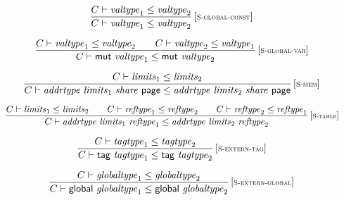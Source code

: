 $$
\begin{array}{@{}c@{}}\displaystyle
\frac{
C \vdash {\mathit{valtype}}_1 \leq {\mathit{valtype}}_2
}{
C \vdash {\mathit{valtype}}_1 \leq {\mathit{valtype}}_2
} \, {[\textsc{\scriptsize S{-}global{-}const}]}
\qquad
\end{array}
$$

$$
\begin{array}{@{}c@{}}\displaystyle
\frac{
C \vdash {\mathit{valtype}}_1 \leq {\mathit{valtype}}_2
 \qquad
C \vdash {\mathit{valtype}}_2 \leq {\mathit{valtype}}_1
}{
C \vdash \mathsf{mut}~{\mathit{valtype}}_1 \leq \mathsf{mut}~{\mathit{valtype}}_2
} \, {[\textsc{\scriptsize S{-}global{-}var}]}
\qquad
\end{array}
$$

$$
\begin{array}{@{}c@{}}\displaystyle
\frac{
C \vdash {\mathit{limits}}_1 \leq {\mathit{limits}}_2
}{
C \vdash {\mathit{addrtype}}~{\mathit{limits}}_1~{\mathit{share}}~\mathsf{page} \leq {\mathit{addrtype}}~{\mathit{limits}}_2~{\mathit{share}}~\mathsf{page}
} \, {[\textsc{\scriptsize S{-}mem}]}
\qquad
\end{array}
$$

$$
\begin{array}{@{}c@{}}\displaystyle
\frac{
C \vdash {\mathit{limits}}_1 \leq {\mathit{limits}}_2
 \qquad
C \vdash {\mathit{reftype}}_1 \leq {\mathit{reftype}}_2
 \qquad
C \vdash {\mathit{reftype}}_2 \leq {\mathit{reftype}}_1
}{
C \vdash {\mathit{addrtype}}~{\mathit{limits}}_1~{\mathit{reftype}}_1 \leq {\mathit{addrtype}}~{\mathit{limits}}_2~{\mathit{reftype}}_2
} \, {[\textsc{\scriptsize S{-}table}]}
\qquad
\end{array}
$$

\vspace{1ex}

$$
\begin{array}{@{}c@{}}\displaystyle
\frac{
C \vdash {\mathit{tagtype}}_1 \leq {\mathit{tagtype}}_2
}{
C \vdash \mathsf{tag}~{\mathit{tagtype}}_1 \leq \mathsf{tag}~{\mathit{tagtype}}_2
} \, {[\textsc{\scriptsize S{-}extern{-}tag}]}
\qquad
\end{array}
$$

$$
\begin{array}{@{}c@{}}\displaystyle
\frac{
C \vdash {\mathit{globaltype}}_1 \leq {\mathit{globaltype}}_2
}{
C \vdash \mathsf{global}~{\mathit{globaltype}}_1 \leq \mathsf{global}~{\mathit{globaltype}}_2
} \, {[\textsc{\scriptsize S{-}extern{-}global}]}
\qquad
\end{array}
$$


